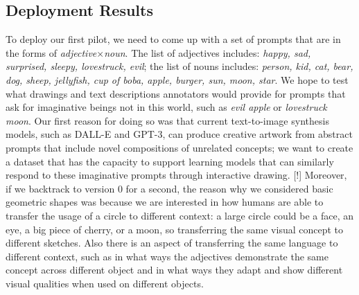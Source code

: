 
\subsection{Deployment Results}


To deploy our first pilot, we need to come up with a set of prompts that are in the forms of \textit{adjective}$\times$\textit{noun}. The list of adjectives includes: 
\textit{happy, sad, surprised, sleepy, lovestruck, evil};
the list of nouns includes: 
\textit{person, kid, cat, bear, dog, sheep, jellyfish, cup of boba, apple, burger, sun, moon, star}.
We hope to test what drawings and text descriptions annotators would provide for prompts that ask for imaginative beings not in this world, such as \textit{evil apple} or \textit{lovestruck moon}. Our first reason for doing so was that current text-to-image synthesis models, such as DALL-E and GPT-3, can produce creative artwork from abstract prompts that include novel compositions of unrelated concepts; we want to create a dataset that has the capacity to support learning models that can similarly respond to these imaginative prompts through interactive drawing. 
[!] Moreover, if we backtrack to version 0 for a second, the reason why we considered basic geometric shapes was because we are interested in how humans are able to transfer the usage of a circle to different context: a large circle could be a face, an eye, a big piece of cherry, or a moon, so transferring the same visual concept to different sketches. Also there is an aspect of transferring the same language to different context, such as in what ways the adjectives demonstrate the same concept across different object and in what ways they adapt and show different visual qualities when used on different objects.   

